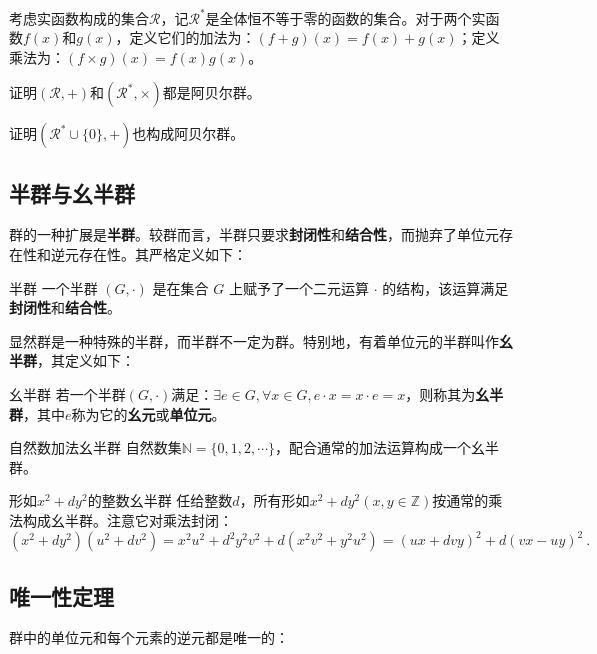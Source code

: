 \begin{exercise}{}
考虑实函数构成的集合$\mathcal{R}$，记$\mathcal{R}^*$是全体恒不等于零的函数的集合。对于两个实函数$f(x)$和$g(x)$，定义它们的加法为：$(f+g)(x)=f(x)+g(x)$；定义乘法为：$(f\times g)(x)=f(x) g(x)$。

证明$(\mathcal{R}, +)$和$(\mathcal{R}^*,\times )$都是阿贝尔群。

证明$(\mathcal{R}^*\cup \{0\}, +)$也构成阿贝尔群。
\end{exercise}

\subsection{半群与幺半群}

群的一种扩展是\textbf{半群}。较群而言，半群只要求\textbf{封闭性}和\textbf{结合性}，而抛弃了单位元存在性和逆元存在性。其严格定义如下：

\begin{definition}{半群}
一个半群 $(G, \cdot)$ 是在集合 $G$ 上赋予了一个二元运算 $\cdot$ 的结构，该运算满足\textbf{封闭性}和\textbf{结合性}。
\end{definition}

显然群是一种特殊的半群，而半群不一定为群。特别地，有着单位元的半群叫作\textbf{幺半群}，其定义如下：

\begin{definition}{幺半群}
若一个半群$(G,\cdot )$满足：$\exists e\in G,\forall x\in G,e\cdot x=x\cdot e=x$，则称其为\textbf{幺半群}，其中$e$称为它的\textbf{幺元}或\textbf{单位元}。
\end{definition}

\begin{example}{自然数加法幺半群}
自然数集$\mathbb N=\{0,1,2,\cdots \}$，配合通常的加法运算构成一个幺半群。
\end{example}

\begin{example}{形如$x^2+dy^2$的整数幺半群}
任给整数$d$，所有形如$x^2+dy^2(x,y\in \mathbb Z)$按通常的乘法构成幺半群。注意它对乘法封闭：
$$(x^2+dy^2)(u^2+dv^2)=x^2u^2+d^2y^2v^2+d(x^2v^2+y^2u^2)=(ux+dvy)^2+d(vx-uy)^2~.$$
\end{example}




\subsection{唯一性定理}

群中的单位元和每个元素的逆元都是唯一的：

